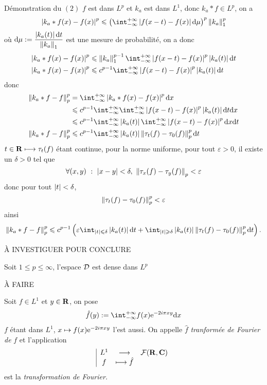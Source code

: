 \documentclass[a4paper,11pt, twoside]{article}
\begin{document}
\begin{ProofC}{Démonstration du $(\mathit 2)$}
  $f$ est dans $L^p$ et $k_a$ est dans $L^1$, donc $k_a*f\in L^p$, on a 
  $$\abs{k_a*f(x)-f(x)}^p\leqslant\Par{\intr\abs{f(x-t)-f(x)}\dmu}^p\norm{k_a}_1^p$$
  où $\mathrm d\mu:=\displaystyle\frac{\left| k_a(t)\right|\mathrm dt}{\left\lVert k_a\right\rVert_1}$ est une mesure de probabilité, on a donc
  \begin{align*}
    \abs{k_a*f(x)-f(x)}^p&\leqslant\norm{k_a}_1^{p-1}\intr\abs{f(x-t)-f(x)}^p\abs{k_a(t)}\dt\\
    \abs{k_a*f(x)-f(x)}^p&\leqslant c^{p-1}\intr\abs{f(x-t)-f(x)}^p\abs{k_a(t)}\dt
  \end{align*}
  donc 
  \begin{align*}
    \norm{k_a*f-f}_p^p&=\intr\abs{k_a*f(x)-f(x)}^p\dx\\
    &\leqslant c^{p-1}\intr\intr\abs{f(x -t)-f(x)}^p\abs{k_a(t)}\dt\dx\\
    &\leqslant c^{p-1}\intr\abs{k_a(t)}\intr\abs{f(x-t)-f(x)}^p\dx\dt\\
    \norm{k_a*f-f}_p^p&\leqslant c^{p-1}\intr\abs{k_a(t)}\norm{\tau_t(f)-\tau_0(f)}_p^p\dt
  \end{align*}
  $t\in\mathbf R\longmapsto \tau_t(f)$ étant continue, pour la norme uniforme, pour tout $\varepsilon>0$, il existe un $\delta>0$ tel que 
  $$\forall (x,y)\ :\ \abs{x-y}<\delta,\ \norm{\tau_x(f)-\tau_y(f)}_p<\varepsilon$$
  donc pour tout $\left| t\right|<\delta$,
  $$\left\lVert\tau_t(f)-\tau_0(f)\right\rVert_p^p<\varepsilon$$
  ainsi 
  $$\norm{k_a*f-f}_p^p\leqslant c^{p-1}\Par{\varepsilon\int_{\abs t\leqslant \delta}\abs{k_a(t)}\dt+\int_{\abs t\geqslant \delta}\abs{k_a(t)}\norm{\tau_t(f)-\tau_0(f)}_p^p\dt}.$$


  À INVESTIGUER POUR CONCLURE
\end{ProofC}

\begin{prop}
  Soit $1\leqslant p\leqslant \infty$, l'espace $\mathcal D$ est dense dans $L^p$
\end{prop}


\begin{Proof}
  À FAIRE
\end{Proof}




Soit $f\in L^1$ et $y\in \mathbf R$, on pose 
$$\hat f(y):=\intr f(x)\ex{-2i\pi xy}\dx$$
$f$ étant dans $L^1$, $x\mapsto f(x)\mathrm{e}^{-2i\pi xy}$ l'est aussi. On appelle $\hat f$ \emph{tranformée de Fourier de }$f$ et l'application 
$$\begin{array}{|ccc}
  L^1&\longrightarrow&\mathcal{F}(\mathbf R,\mathbf C)\\
  f&\longmapsto \hat f
\end{array}$$
est la \emph{transformation de Fourier.}
\end{document}
